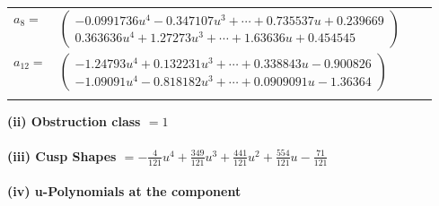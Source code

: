 \documentclass[1p]{elsarticle_modified}
\theoremstyle{definition}
\begin{document}
\begin{tabular}{m{7pt} m{180pt} m{7pt} m{180pt} }
\flushright $a_{8}=$&$\begin{pmatrix}-0.0991736 u^{4}-0.347107 u^{3}+\cdots+0.735537 u+0.239669\\0.363636 u^{4}+1.27273 u^{3}+\cdots+1.63636 u+0.454545\end{pmatrix}$ \\
\flushright $a_{12}=$&$\begin{pmatrix}-1.24793 u^{4}+0.132231 u^{3}+\cdots+0.338843 u-0.900826\\-1.09091 u^{4}-0.818182 u^{3}+\cdots+0.0909091 u-1.36364\end{pmatrix}$\\&\end{tabular}
\flushleft \textbf{(ii) Obstruction class $= 1$}\\~\\
\flushleft \textbf{(iii) Cusp Shapes $= -\frac{4}{121} u^4+\frac{349}{121} u^3+\frac{441}{121} u^2+\frac{554}{121} u-\frac{71}{121}$}\\~\\
\newpage\renewcommand{\arraystretch}{1}
\flushleft \textbf{(iv) u-Polynomials at the component}\newline \\
\end{document}
